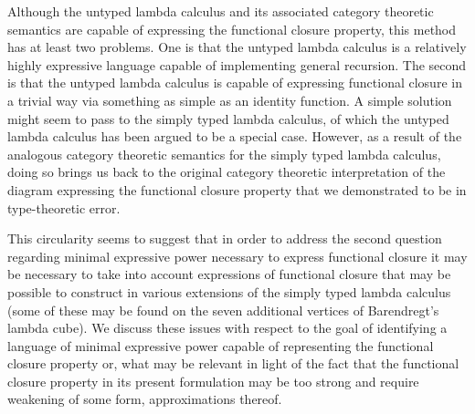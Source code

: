 Although the untyped lambda calculus and its associated category theoretic semantics are capable of expressing the functional closure property, this method has at least two problems. One is that the untyped lambda calculus is a relatively highly expressive language capable of implementing general recursion. The second is that the untyped lambda calculus is capable of expressing functional closure in a trivial way via something as simple as an identity function. A simple solution might seem to pass to the simply typed lambda calculus, of which the untyped lambda calculus has been argued to be a special case. However, as a result of the analogous category theoretic semantics for the simply typed lambda calculus, doing so brings us back to the original category theoretic interpretation of the diagram expressing the functional closure property that we demonstrated to be in type-theoretic error.

This circularity seems to suggest that in order to address the second question regarding minimal expressive power necessary to express functional closure it may be necessary to take into account expressions of functional closure that may be possible to construct in various extensions of the simply typed lambda calculus (some of these may be found on the seven additional vertices of Barendregt's lambda cube). We discuss these issues with respect to the goal of identifying a language of minimal expressive power capable of representing the functional closure property or, what may be relevant in light of the fact that the functional closure property in its present formulation may be too strong and require weakening of some form, approximations thereof.